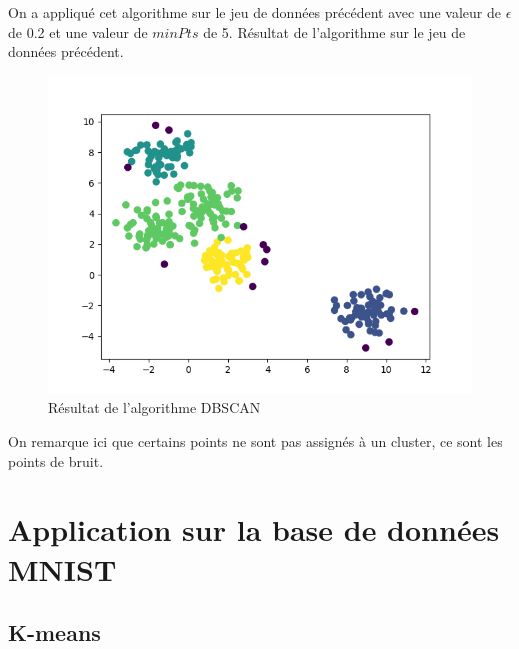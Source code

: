 \documentclass[french,a4paper,18pt]{article}
\begin{document}
On a appliqué cet algorithme sur le jeu de données précédent avec une valeur de $\epsilon$ de 0.2 et une valeur de $minPts$ de 5.
Résultat de l'algorithme sur le jeu de données précédent.
\begin{figure}[h!]
    \centering
    \includegraphics[scale=0.5]{images/short_simulation_dbscan.png}
    \caption{Résultat de l'algorithme DBSCAN}\label{fig:short_simulation_dbscan}
\end{figure}

On remarque ici que certains points ne sont pas assignés à un cluster, ce sont les points de bruit.

\section{Application sur la base de données MNIST}
\subsection{K-means}
\end{document}
